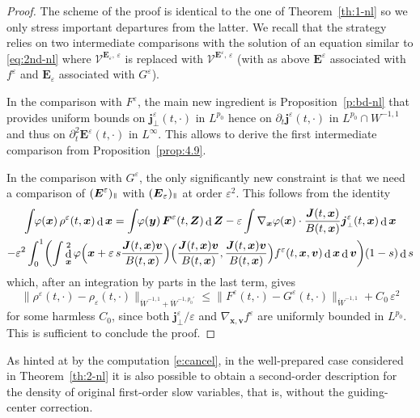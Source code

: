 \documentclass[10pt]{amsart}
\let\mathcal\mathscr
\newcommand{\sperp}{{\scriptscriptstyle\perp}}
\let\eps\varepsilon
\let\d\partial
\DeclareMathOperator\dD{d}\let\dd\dD
\theoremstyle{plain}
\theoremstyle{definition}
\newcommand\bE{{\boldsymbol E}}
\newcommand\bF{{\boldsymbol F}}
\newcommand\bJ{{\boldsymbol J}}
\newcommand\bZ{{\boldsymbol Z}}
\newcommand\bfj{{\boldsymbol j}}
\newcommand\bfv{{\boldsymbol v}}
\newcommand\bfx{{\boldsymbol x}}
\newcommand\bfy{{\boldsymbol y}}
\newcommand\cV{{\mathcal V}}
\newcommand{\mypar}{{\mkern3mu\vphantom{\perp}\vrule depth 0pt\mkern2mu\vrule depth 0pt\mkern3mu}}
\begin{document}
\begin{proof}
The scheme of the proof is identical to the one of Theorem~\ref{th:1-nl} so we only stress important departures from the latter. We recall that the strategy relies on two intermediate comparisons with the solution of an equation similar to \eqref{eq:2nd-nl} where $\cV^{\bE_\eps,\,\eps}$ is replaced with $\cV^{\bE^\eps,\,\eps}$ (with as above $\bE^\eps$ associated with $f^\eps$ and $\bE_\eps$ associated with $G^\eps$).

In the comparison with $F^\eps$, the main new ingredient is Proposition~\ref{p:bd-nl} that provides uniform bounds on $\bfj_\sperp^\eps(t,\cdot)$ in $L^{p_0}$ hence on $\d_t\bfj^\eps(t,\cdot)$ in $L^{p_0}\cap W^{-1,1}$ and thus on $\d_t^2\bE^\eps(t,\cdot)$ in $L^\infty$. This allows to derive the first intermediate comparison from Proposition~\ref{prop:4.9}.

In the comparison with $G^\eps$, the only significantly new constraint is that we need a comparison of $(\bE^\eps)_\mypar$ with $(\bE_\eps)_\mypar$ at order $\eps^2$. This follows from the identity
\begin{multline}\label{e:cancel}
\int\hspace*{-1mm} \varphi(\bfx)\,\rho^\eps(t,\bfx)\dD\bfx
=
\int\hspace*{-1mm} \varphi(\bfy)\, \bF^\eps(t,\bZ)\dD\bZ
-\eps\int \nabla_\bfx\varphi(\bfx)\cdot\frac{\bJ(t,\bfx)}{B(t,\bfx)}\bfj_\sperp^\eps(t,\bfx)\dD\bfx\\
-\eps^2\int_0^1\biggl(
\int \dD_\bfx^2\varphi\Bigl(\bfx+\eps\,s\frac{\bJ(t,\bfx)\bfv}{B(t,\bfx)}\Bigr)\Bigl(\frac{\bJ(t,\bfx)\bfv}{B(t,\bfx)},\frac{\bJ(t,\bfx)\bfv}{B(t,\bfx)}\Bigr)
f^\eps(t,\bfx,\bfv)\dD \bfx\dD\bfv\biggr)(1-s)\dD s
\end{multline}
which, after an integration by parts in the last term, gives
\[
\|\rho^\eps(t,\cdot)-\rho_\eps(t,\cdot)\|_{\dot{W}^{-1,1}+\dot{W}^{-1,p_0'}}
\leq
\|F^\eps(t,\cdot)-G^\eps(t,\cdot)\|_{\dot{W}^{-1,1}}
+C_0\,\eps^2
\]
for some harmless $C_0$, since both $\bfj_\sperp^\eps/\eps$ and $\nabla_{\bfx,\bfv}f^\eps$ are uniformly bounded in $L^{p_0}$. This is sufficient to conclude the proof.
\end{proof}

As hinted at by the computation \eqref{e:cancel}, in the well-prepared case considered in Theorem~\ref{th:2-nl} it is also possible to obtain a second-order description for the density of original first-order slow variables, that is, without the guiding-center correction.
\end{document}
